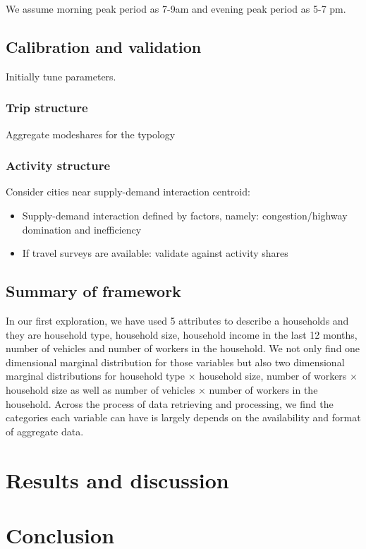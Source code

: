 \documentclass[11pt,twoside]{article}
\numberwithin{equation}{section}
\newcommand{\?}{\stackrel{?}{=}}
\begin{document}
We assume morning peak period as 7-9am and evening peak period as 5-7 pm.


\subsection{Calibration and validation}
Initially tune parameters. 
  
\subsubsection{Trip structure}
Aggregate modeshares for the typology
  
\subsubsection{Activity structure}
Consider cities near supply-demand interaction centroid:
\begin{itemize}
\item Supply-demand interaction defined by factors, namely: congestion/highway domination and inefficiency
\item If travel surveys are available: validate against activity shares
\end{itemize}


\subsection{Summary of framework}
In our first exploration, we have used 5 attributes to describe a households and they are household type, household size, household income in the last 12 months, number of vehicles and number of workers in the household. We not only find one dimensional marginal distribution for those variables but also two dimensional marginal distributions for household type $\times$ household size, number of workers $\times$ household size as well as number of vehicles $\times$ number of workers in the household. Across the process of data retrieving and processing, we find the categories each variable can have is largely depends on the availability and format of aggregate data.




\section{Results and discussion}




\section{Conclusion}
\printbibliography
\end{document}
